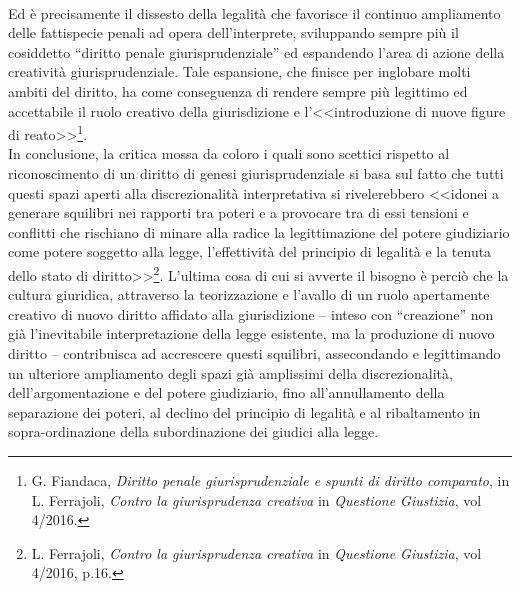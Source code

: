 \\Ed è precisamente il dissesto della legalità che favorisce il continuo ampliamento delle fattispecie penali ad opera dell'interprete, sviluppando sempre più il cosiddetto “diritto penale giurisprudenziale” ed espandendo l'area di azione della creatività giurisprudenziale.
Tale espansione, che finisce per inglobare molti ambiti del diritto, ha come conseguenza di rendere sempre più legittimo ed accettabile il ruolo creativo della giurisdizione e l’<<introduzione di nuove figure di reato>>\footnote{G. Fiandaca, \textit{Diritto penale giurisprudenziale e spunti di diritto comparato}, in L. Ferrajoli, \textit{Contro la giurisprudenza creativa} in \textit{Questione Giustizia}, vol 4/2016.}.
\\In conclusione, la critica mossa da coloro i quali sono scettici rispetto al riconoscimento di un diritto di genesi giurisprudenziale si basa sul fatto che tutti questi spazi aperti alla discrezionalità interpretativa si rivelerebbero  <<idonei a generare squilibri nei rapporti tra poteri e a provocare tra di essi tensioni e conflitti che rischiano di minare alla radice la legittimazione del potere giudiziario come potere soggetto alla legge, l’effettività del principio di legalità e la tenuta dello stato di diritto>>\footnote{L. Ferrajoli, \textit{Contro la giurisprudenza creativa} in \textit{Questione Giustizia}, vol 4/2016, p.16.}. L’ultima cosa di cui si avverte il bisogno è perciò che la cultura giuridica, attraverso la teorizzazione e l’avallo di un ruolo apertamente creativo di nuovo diritto affidato alla giurisdizione – inteso con “creazione” non già l’inevitabile interpretazione della legge esistente, ma la produzione di nuovo diritto – contribuisca ad accrescere questi squilibri, assecondando e legittimando un ulteriore ampliamento degli spazi già amplissimi della discrezionalità, dell’argomentazione e del potere giudiziario, fino all’annullamento della separazione dei poteri, al declino del principio di legalità e al ribaltamento in sopra-ordinazione della subordinazione dei giudici alla legge.

